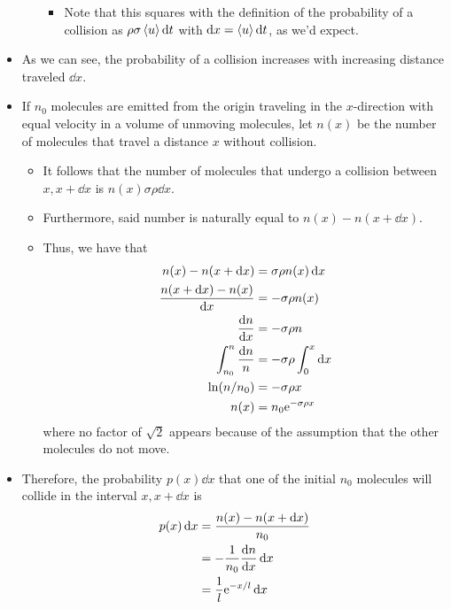 \documentclass[../notes.tex]{subfiles}
\begin{document}
\begin{itemize}
\begin{itemize}
        \begin{itemize}
            \item Note that this squares with the definition of the probability of a collision as $\rho\sigma\prb{u}\dd{t}$ with $\dd{x}=\prb{u}\dd{t}$, as we'd expect.
        \end{itemize}
    \end{itemize}
    \item As we can see, the probability of a collision increases with increasing distance traveled $\dd{x}$.
    \item If $n_0$ molecules are emitted from the origin traveling in the $x$-direction with equal velocity in a volume of unmoving molecules, let $n(x)$ be the number of molecules that travel a distance $x$ without collision.
    \begin{itemize}
        \item It follows that the number of molecules that undergo a collision between $x,x+\dd{x}$ is $n(x)\sigma\rho\dd{x}$.
        \item Furthermore, said number is naturally equal to $n(x)-n(x+\dd{x})$.
        \item Thus, we have that
        \begin{align*}
            n(x)-n(x+\dd{x}) &= \sigma\rho n(x)\dd{x}\\
            \frac{n(x+\dd{x})-n(x)}{\dd{x}} &= -\sigma\rho n(x)\\
            \dv{n}{x} &= -\sigma\rho n\\
            \int_{n_0}^n\frac{\dd{n}}{n} &= -\sigma\rho\int_0^x\dd{x}\\
            \ln(n/n_0) &= -\sigma\rho x\\
            n(x) &= n_0\e[-\sigma\rho x]
        \end{align*}
        where no factor of $\sqrt{2}$ appears because of the assumption that the other molecules do not move.
    \end{itemize}
    \item Therefore, the probability $p(x)\dd{x}$ that one of the initial $n_0$ molecules will collide in the interval $x,x+\dd{x}$ is
    \begin{align*}
        p(x)\dd{x} &= \frac{n(x)-n(x+\dd{x})}{n_0}\\
        &= -\frac{1}{n_0}\dv{n}{x}\dd{x}\\
        &= \frac{1}{l}\e[-x/l]\dd{x}
    \end{align*}
    \begin{itemize}

\end{itemize}
\end{itemize}
\end{document}
